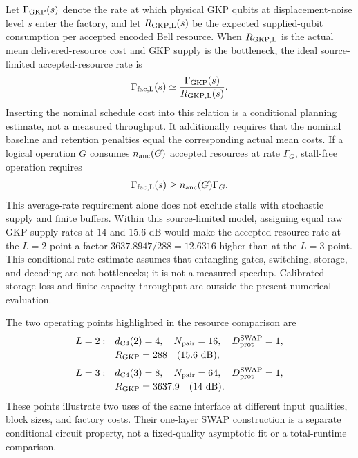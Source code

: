 \documentclass[aps,
prx,
superscriptaddress,
reprint,
longbibliography,
floatfix]{revtex4-2}
\begin{document}
Let $\Gamma_{\rm GKP}(s)$ denote the rate at which physical GKP qubits at displacement-noise level $s$ enter the factory, and let $R_{\rm GKP,L}(s)$ be the expected supplied-qubit consumption per accepted encoded Bell resource. When $R_{\rm GKP,L}$ is the actual mean delivered-resource cost and GKP supply is the bottleneck, the ideal source-limited accepted-resource rate is
\begin{equation}
\Gamma_{\rm fac,L}(s)\simeq
\frac{\Gamma_{\rm GKP}(s)}{R_{\rm GKP,L}(s)}.
\label{eq:source_limited_factory_rate}
\end{equation}
Inserting the nominal schedule cost into this relation is a conditional planning estimate, not a measured throughput. It additionally requires that the nominal baseline and retention penalties equal the corresponding actual mean costs.
If a logical operation $G$ consumes $n_{\rm anc}(G)$ accepted resources at rate $\Gamma_G$, stall-free operation requires
\begin{equation}
\Gamma_{\rm fac,L}(s)\ge n_{\rm anc}(G)\Gamma_G.
\label{eq:stall_free_condition}
\end{equation}
This average-rate requirement alone does not exclude stalls with stochastic supply and finite buffers.
Within this source-limited model, assigning equal raw GKP supply rates at $14$ and $15.6$ dB would make the accepted-resource rate at the $L=2$ point a factor $3637.8947/288=12.6316$ higher than at the $L=3$ point. This conditional rate estimate assumes that entangling gates, switching, storage, and decoding are not bottlenecks; it is not a measured speedup. Calibrated storage loss and finite-capacity throughput are outside the present numerical evaluation.

The two operating points highlighted in the resource comparison are
\begin{align}
L=2:&\quad d_{\rm C4}(2)=4,\quad N_{\rm pair}=16,\quad D_{\rm prot}^{\rm SWAP}=1,\nonumber\\[-2pt]
&\quad R_{\rm GKP}=288\quad (15.6\ \mathrm{dB}),\nonumber\\[2pt]
L=3:&\quad d_{\rm C4}(3)=8,\quad N_{\rm pair}=64,\quad D_{\rm prot}^{\rm SWAP}=1,\nonumber\\[-2pt]
&\quad R_{\rm GKP}=3637.9\quad (14\ \mathrm{dB}).
\label{eq:distance_depth_operating_points}
\end{align}
These points illustrate two uses of the same interface at different input qualities, block sizes, and factory costs. Their one-layer SWAP construction is a separate conditional circuit property, not a fixed-quality asymptotic fit or a total-runtime comparison.
\end{document}

